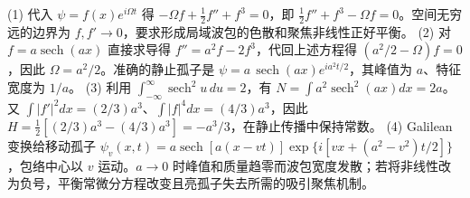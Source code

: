 (1) 代入 \(\psi=f(x)e^{i\Omega t}\) 得 \(-\Omega f+\frac12f''+f^3=0\)，即 \(\frac12f''+f^3-\Omega f=0\)。空间无穷远的边界为 \(f,f'\to0\)，要求形成局域波包的色散和聚焦非线性正好平衡。
(2) 对 \(f=a\operatorname{sech}(ax)\) 直接求导得 \(f''=a^2f-2f^3\)，代回上述方程得 \((a^2/2-\Omega)f=0\)，因此 \(\Omega=a^2/2\)。准确的静止孤子是 \(\psi=a\,\operatorname{sech}(ax)e^{ia^2t/2}\)，其峰值为 \(a\)、特征宽度为 \(1/a\)。
(3) 利用 \(\int_{-\infty}^\infty\operatorname{sech}^2u\,du=2\)，有 \(N=\int a^2\operatorname{sech}^2(ax)dx=2a\)。又 \(\int|f'|^2dx=(2/3)a^3\)、\(\int|f|^4dx=(4/3)a^3\)，因此 \(H=\frac12[(2/3)a^3-(4/3)a^3]=-a^3/3\)，在静止传播中保持常数。
(4) Galilean变换给移动孤子 \(\psi_v(x,t)=a\operatorname{sech}[a(x-vt)]\exp\{i[vx+(a^2-v^2)t/2]\}\)，包络中心以 \(v\) 运动。\(a\to0\) 时峰值和质量趋零而波包宽度发散；若将非线性改为负号，平衡常微分方程改变且亮孤子失去所需的吸引聚焦机制。
